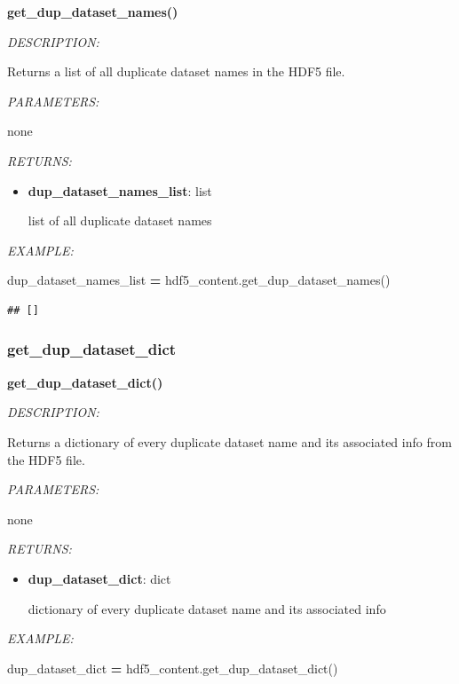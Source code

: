 \documentclass[
]{article}
\newenvironment{Shaded}{\begin{snugshade}}{\end{snugshade}}
\newcommand{\NormalTok}[1]{#1}
\newcommand{\OperatorTok}[1]{\textcolor[rgb]{0.81,0.36,0.00}{\textbf{#1}}}
\begin{document}
\textbf{get\_dup\_dataset\_names()}

\emph{DESCRIPTION:}

Returns a list of all duplicate dataset names in the HDF5 file.

\emph{PARAMETERS:}

none

\emph{RETURNS:}

\begin{itemize}
\item
  \textbf{dup\_dataset\_names\_list}: list

  list of all duplicate dataset names
\end{itemize}

\emph{EXAMPLE:}

\begin{Shaded}
\begin{Highlighting}[]
\NormalTok{dup_dataset_names_list }\OperatorTok{=}\NormalTok{ hdf5_content.get_dup_dataset_names()}
\end{Highlighting}
\end{Shaded}

\begin{verbatim}
## []
\end{verbatim}

\hypertarget{get_dup_dataset_dict}{%
\subsubsection{get\_dup\_dataset\_dict}\label{get_dup_dataset_dict}}

\textbf{get\_dup\_dataset\_dict()}

\emph{DESCRIPTION:}

Returns a dictionary of every duplicate dataset name and its associated info from the HDF5 file.

\emph{PARAMETERS:}

none

\emph{RETURNS:}

\begin{itemize}
\item
  \textbf{dup\_dataset\_dict}: dict

  dictionary of every duplicate dataset name and its associated info
\end{itemize}

\emph{EXAMPLE:}

\begin{Shaded}
\begin{Highlighting}[]
\NormalTok{dup_dataset_dict }\OperatorTok{=}\NormalTok{ hdf5_content.get_dup_dataset_dict()}
\end{Highlighting}
\end{Shaded}
\end{document}
